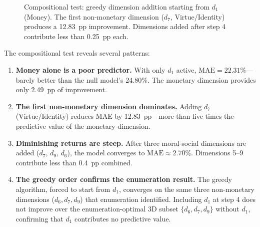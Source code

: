 \documentclass[manuscript,review,anonymous]{acmart}
\newcommand{\MAE}{\mathrm{MAE}}
\begin{document}
\begin{figure}[t]
\centering
{}
\caption{Compositional test: greedy dimension addition starting from $d_1$ (Money). The first non-monetary dimension ($d_7$, Virtue/Identity) produces a 12.83~pp improvement. Dimensions added after step 4 contribute less than 0.25~pp each.}
\label{fig:compositional}
\end{figure}

The compositional test reveals several patterns:

\begin{enumerate}
    \item \textbf{Money alone is a poor predictor.} With only $d_1$ active, $\MAE = 22.31\%$---barely better than the null model's 24.80\%. The monetary dimension provides only 2.49~pp of improvement.
    \item \textbf{The first non-monetary dimension dominates.} Adding $d_7$ (Virtue/Identity) reduces MAE by 12.83~pp---more than five times the predictive value of the monetary dimension.
    \item \textbf{Diminishing returns are steep.} After three moral-social dimensions are added ($d_7$, $d_9$, $d_6$), the model converges to $\MAE \approx 2.70\%$. Dimensions 5--9 contribute less than 0.4~pp combined.
    \item \textbf{The greedy order confirms the enumeration result.} The greedy algorithm, forced to start from $d_1$, converges on the same three non-monetary dimensions ($d_6, d_7, d_9$) that enumeration identified. Including $d_1$ at step 4 does not improve over the enumeration-optimal 3D subset $\{d_6, d_7, d_9\}$ without $d_1$, confirming that $d_1$ contributes no predictive value.
\end{enumerate}
\end{document}
